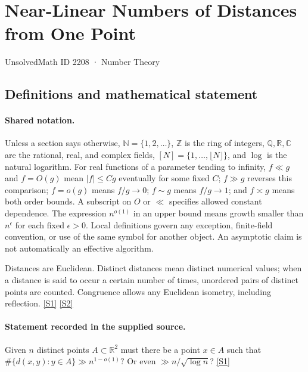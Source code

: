 \documentclass[11pt,a4paper]{article}
\newcommand{\N}{\mathbb{N}}
\newcommand{\Z}{\mathbb{Z}}
\newcommand{\Q}{\mathbb{Q}}
\newcommand{\R}{\mathbb{R}}
\newcommand{\C}{\mathbb{C}}
\newcommand{\sref}[2]{\hyperlink{source:#1:#2}{[S#2]}}
\begin{document}

\setcounter{section}{2207}

\section{Near-Linear Numbers of Distances from One Point}\label{2208}

{\small\sffamily UnsolvedMath ID 2208 · Number Theory}

\subsection{Definitions and mathematical statement}

\paragraph{Shared notation.}Unless a section says otherwise, $\N=\{1,2,\ldots\}$,
$\Z$ is the ring of integers, $\Q,\R,\C$ are the rational, real, and complex
fields, $[N]=\{1,\ldots,\lfloor N\rfloor\}$, and $\log$ is the natural
logarithm. For real functions of a parameter tending to infinity,
$f\ll g$ and $f=O(g)$ mean $|f|\leq Cg$ eventually for some fixed $C$;
$f\gg g$ reverses this comparison; $f=o(g)$ means $f/g\to0$;
$f\sim g$ means $f/g\to1$; and $f\asymp g$ means both order bounds.
A subscript on $O$ or $\ll$ specifies allowed constant dependence.
The expression $n^{o(1)}$ in an upper bound means growth smaller than
$n^\epsilon$ for each fixed $\epsilon>0$. Local definitions govern any
exception, finite-field convention, or use of the same symbol for another
object. An asymptotic claim is not automatically an effective algorithm.



Distances are Euclidean. Distinct distances mean distinct numerical values; when a distance is said to occur a certain number of times, unordered pairs of distinct points are counted. Congruence allows any Euclidean isometry, including reflection. \sref{2208}{1} \sref{2208}{2}

\paragraph{Statement recorded in the supplied source.}
Given $n$ distinct points $A\subset\mathbb{R}^2$ must there be a point $x\in A$ such that $ \#\{ d(x,y) : y \in A\} \gg n^{1-o(1)}? $ Or even $\gg n/\sqrt{\log n}$? \sref{2208}{1}
\end{document}
